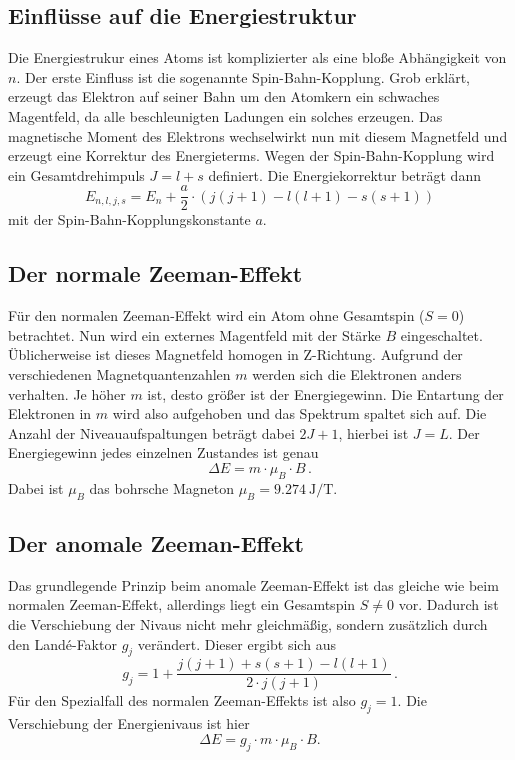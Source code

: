\subsection{Einflüsse auf die Energiestruktur}
\label{ssec:theo2}

Die Energiestrukur eines Atoms ist komplizierter als eine bloße Abhängigkeit von $n$.
Der erste Einfluss ist die sogenannte Spin-Bahn-Kopplung.
Grob erklärt, erzeugt das Elektron auf seiner Bahn um den Atomkern ein schwaches Magentfeld, da alle beschleunigten Ladungen ein solches erzeugen.
Das magnetische Moment des Elektrons wechselwirkt nun mit diesem Magnetfeld und erzeugt eine Korrektur des Energieterms. 
Wegen der Spin-Bahn-Kopplung wird ein Gesamtdrehimpuls $J = l + s$ definiert.
Die Energiekorrektur beträgt dann 
\begin{equation}
    E_{n,l,j,s} = E_n + \frac{a}{2} \cdot \left( j(j+1) - l(l+1) - s(s+1) \right)
   \label{eq:spinbahn}
\end{equation}
mit der Spin-Bahn-Kopplungskonstante $a$.

\subsection{Der normale Zeeman-Effekt}
\label{ssec:theo3}

Für den normalen Zeeman-Effekt wird ein Atom ohne Gesamtspin ($S = 0$) betrachtet. 
Nun wird ein externes Magentfeld mit der Stärke $B$ eingeschaltet. 
Üblicherweise ist dieses Magnetfeld homogen in Z-Richtung. 
Aufgrund der verschiedenen Magnetquantenzahlen $m$ werden sich die Elektronen anders verhalten. Je höher $m$ ist, desto größer ist der Energiegewinn.
Die Entartung der Elektronen in $m$ wird also aufgehoben und das Spektrum spaltet sich auf.
Die Anzahl der Niveauaufspaltungen beträgt dabei $2 J + 1$, hierbei ist $J = L$.
Der Energiegewinn jedes einzelnen Zustandes ist genau 
\begin{equation}
    \Delta E = m \cdot \mu_B \cdot B \, .
   \label{eq:normzeeman}
\end{equation}
Dabei ist $\mu_B$ das bohrsche Magneton $\mu_B = \SI{9.274}{\joule\per\tesla}$.

\subsection{Der anomale Zeeman-Effekt}
\label{ssec:theo4}

Das grundlegende Prinzip beim anomale Zeeman-Effekt ist das gleiche wie beim normalen Zeeman-Effekt, allerdings liegt ein Gesamtspin $S \neq 0$ vor.
Dadurch ist die Verschiebung der Nivaus nicht mehr gleichmäßig, sondern zusätzlich durch den Landé-Faktor $g_j$ verändert. 
Dieser ergibt sich aus 
\begin{equation}
    g_j = 1 + \frac{j(j+1) + s(s+1) - l(l+1) }{2 \cdot j(j+1)} \, .
   \label{eq:lande}
\end{equation}
Für den Spezialfall des normalen Zeeman-Effekts ist also $g_j=1$.
Die Verschiebung der Energienivaus ist hier
\begin{equation}
    \Delta E = g_j \cdot m \cdot \mu_B \cdot B.
   \label{eq:anomzeeman}
\end{equation}

